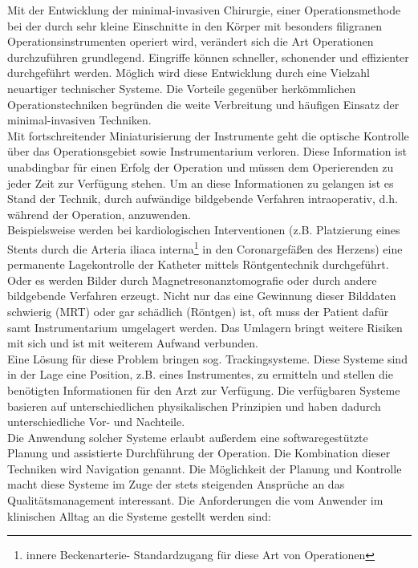 Mit der Entwicklung der minimal-invasiven Chirurgie, einer Operationsmethode bei der durch sehr kleine Einschnitte in den Körper mit besonders filigranen Operationsinstrumenten operiert wird, verändert sich die Art Operationen durchzuführen grundlegend. Eingriffe können schneller, schonender und effizienter durchgeführt werden. Möglich wird diese Entwicklung durch eine Vielzahl neuartiger technischer Systeme. Die Vorteile gegenüber herkömmlichen Operationstechniken begründen die weite Verbreitung und häufigen Einsatz der minimal-invasiven Techniken.\\
Mit fortschreitender Miniaturisierung der Instrumente geht die optische Kontrolle über das Operationsgebiet sowie Instrumentarium verloren. Diese Information ist unabdingbar für einen Erfolg der Operation und müssen dem Operierenden zu jeder Zeit zur Verfügung stehen. Um an diese Informationen zu gelangen ist es Stand der Technik, durch aufwändige bildgebende Verfahren intraoperativ, d.h. während der Operation, anzuwenden.\\
Beispielsweise werden bei kardiologischen Interventionen (z.B. Platzierung eines Stents durch die Arteria iliaca interna\footnote {innere Beckenarterie- Standardzugang für diese Art von Operationen} in den Coronargefäßen des Herzens) eine permanente Lagekontrolle der Katheter mittels Röntgentechnik durchgeführt. Oder es werden Bilder durch Magnetresonanztomografie oder durch andere bildgebende Verfahren erzeugt. Nicht nur das eine Gewinnung dieser Bilddaten schwierig (MRT) oder gar schädlich (Röntgen) ist, oft muss der Patient dafür samt Instrumentarium umgelagert werden. Das Umlagern bringt weitere Risiken mit sich und ist mit weiterem Aufwand verbunden.\\
Eine Lösung für diese Problem bringen sog. Trackingsysteme. Diese Systeme sind in der Lage eine Position, z.B. eines Instrumentes, zu ermitteln und stellen die benötigten Informationen für den Arzt zur Verfügung. Die verfügbaren Systeme basieren auf unterschiedlichen physikalischen Prinzipien und haben dadurch unterschiedliche Vor- und Nachteile.\\
Die Anwendung solcher Systeme erlaubt außerdem eine softwaregestützte Planung und assistierte Durchführung der Operation. Die Kombination dieser Techniken wird Navigation genannt. Die Möglichkeit der Planung und Kontrolle macht diese Systeme im Zuge der stets steigenden Ansprüche an das Qualitätsmanagement interessant. Die Anforderungen die vom Anwender im klinischen Alltag an die Systeme gestellt werden sind:
%

